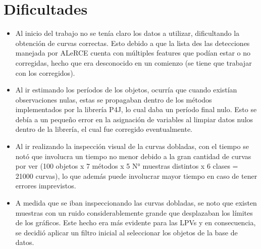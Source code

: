 \newpage
\section{Dificultades}

    \begin{itemize}
        \item Al inicio del trabajo no se tenía claro los datos a utilizar, dificultando la obtención de curvas correctas. Esto debido a que la lista des las detecciones manejada por ALeRCE cuenta con múltiples features que podían estar o no corregidas, hecho que era desconocido en un comienzo (se tiene que trabajar con los corregidos).
        
        \item Al ir estimando los períodos de los objetos, ocurría que cuando existían observaciones nulas, estas se propagaban dentro de los métodos implementados por la librería P4J, lo cual daba un período final nulo. Esto se debía a un pequeño error en la asignación de variables al limpiar datos nulos dentro de la librería, el cual fue corregido eventualmente.
        
        \item Al ir realizando la inspección visual de la curvas dobladas, con el tiempo se notó que involucra un tiempo no menor debido a la gran cantidad de curvas por ver (100 objetos x 7 métodos x 5 N° muestras distintos x 6 clases = 21000 curvas), lo que además puede involucrar mayor tiempo en caso de tener errores imprevistos.
        
        \item A medida que se iban inspeccionando las curvas dobladas, se noto que existen muestras con un ruido considerablemente grande que desplazaban los límites de los gráficos. Este hecho era más evidente para las LPVs y en consecuencia, se decidió aplicar un filtro inicial al seleccionar los objetos de la base de datos.
    \end{itemize}